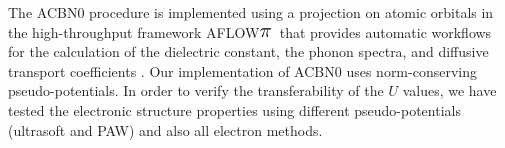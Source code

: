 \documentclass[12pt,a4paper,final]{iopart}
\newcommand{\AFLOWpi}{ {\sf AFLOW$\mathlarger{\mathlarger{\mathlarger{{\pi}}}}$}}
\begin{document}
The ACBN0 procedure is implemented using a projection on atomic orbitals \cite{agapito2013effective, agapito2016accurate, agapito2016accurate2} in the high-throughput framework \AFLOWpi\ that provides automatic workflows for the calculation of the dielectric constant, the phonon spectra, and diffusive transport coefficients \cite{supka2017aflow}.
Our implementation of ACBN0 uses norm-conserving pseudo-potentials. In order to verify the transferability of the $U$ values, we have tested the electronic structure properties using different pseudo-potentials (ultrasoft \cite{garrity2014pseudopotentials} and PAW) and also all electron methods. 
\end{document}

